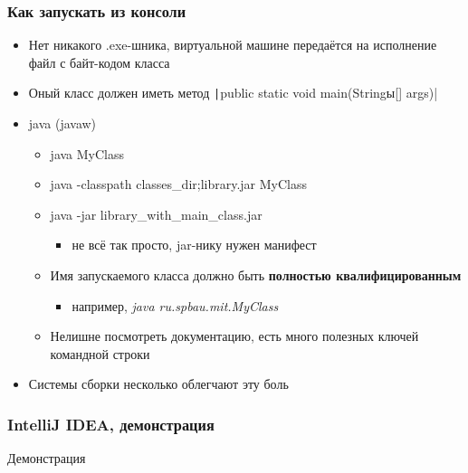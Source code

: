 \documentclass[xetex,mathserif,serif]{beamer}
\begin{document}
	\begin{frame}
		\frametitle{Как запускать из консоли}
		\begin{itemize}
			\item Нет никакого .exe-шника, виртуальной машине передаётся на исполнение файл с байт-кодом класса
			\item Оный класс должен иметь метод \texttt|public static void main(Stringы[] args)|
			\item java (javaw)
			\begin{itemize}
				\item java MyClass
				\item java -classpath classes\_dir;library.jar MyClass
				\item java -jar library\_with\_main\_class.jar
				\begin{itemize}
					\item не всё так просто, jar-нику нужен манифест
				\end{itemize}
				\item Имя запускаемого класса должно быть \textbf{полностью квалифицированным}
				\begin{itemize}
					\item например, \textit{java ru.spbau.mit.MyClass}
				\end{itemize}
				\item Нелишне посмотреть документацию, есть много полезных ключей командной строки
			\end{itemize}
			\item Системы сборки несколько облегчают эту боль
		\end{itemize}
	\end{frame}

	\begin{frame}
		\frametitle{IntelliJ IDEA, демонстрация}
		\begin{center}
			\huge{Демонстрация}
		\end{center}
	\end{frame}
\end{document}

